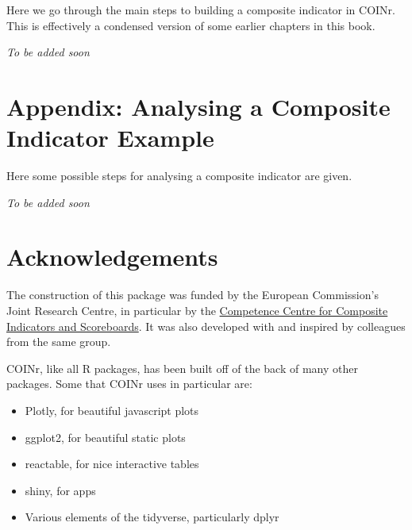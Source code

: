 \documentclass[
]{book}
\providecommand{\tightlist}{%
  \setlength{\itemsep}{0pt}\setlength{\parskip}{0pt}}
\begin{document}
Here we go through the main steps to building a composite indicator in COINr. This is effectively a condensed version of some earlier chapters in this book.

\emph{To be added soon}

\hypertarget{appendix-analysing-a-composite-indicator-example}{%
\chapter{Appendix: Analysing a Composite Indicator Example}\label{appendix-analysing-a-composite-indicator-example}}

Here some possible steps for analysing a composite indicator are given.

\emph{To be added soon}

\hypertarget{acknowledgements}{%
\chapter{Acknowledgements}\label{acknowledgements}}

The construction of this package was funded by the European Commission's Joint Research Centre, in particular by the \href{https://composite-indicators.jrc.ec.europa.eu/}{Competence Centre for Composite Indicators and Scoreboards}. It was also developed with and inspired by colleagues from the same group.

COINr, like all R packages, has been built off of the back of many other packages. Some that COINr uses in particular are:

\begin{itemize}
\tightlist
\item
  Plotly, for beautiful javascript plots
\item
  ggplot2, for beautiful static plots
\item
  reactable, for nice interactive tables
\item
  shiny, for apps
\item
  Various elements of the tidyverse, particularly dplyr
\end{itemize}

  
\end{document}
